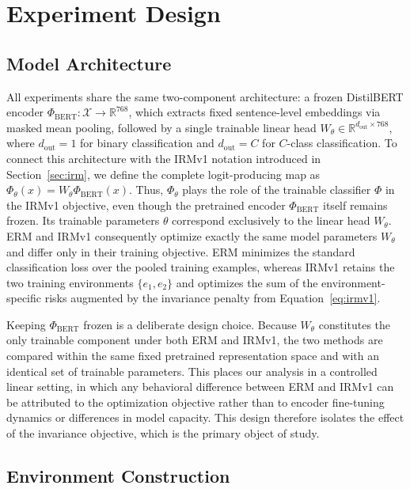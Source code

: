 \documentclass[11pt]{article}
\theoremstyle{definition}
\theoremstyle{plain}
\begin{document}
\section{Experiment Design}
\label{sec:experiment-design}

\subsection{Model Architecture}
\label{sec:model-architecture}

All experiments share the same two-component architecture: a frozen DistilBERT encoder \citep{sanh2019distilbert} $\Phi_{\text{BERT}}: \mathcal{X} \rightarrow \mathbb{R}^{768}$, which extracts fixed sentence-level embeddings via masked mean pooling, followed by a single trainable linear head $W_\theta \in \mathbb{R}^{d_{\text{out}} \times 768}$, where $d_{\text{out}}=1$ for binary classification and $d_{\text{out}}=C$ for $C$-class classification. To connect this architecture with the IRMv1 notation introduced in Section~\ref{sec:irm}, we define the complete logit-producing map as $\Phi_\theta(x) = W_\theta \Phi_{\text{BERT}}(x)$. Thus, $\Phi_\theta$ plays the role of the trainable classifier $\Phi$ in the IRMv1 objective, even though the pretrained encoder $\Phi_{\text{BERT}}$ itself remains frozen. Its trainable parameters $\theta$ correspond exclusively to the linear head $W_\theta$. ERM and IRMv1 consequently optimize exactly the same model parameters $W_\theta$ and differ only in their training objective. ERM minimizes the standard classification loss over the pooled training examples, whereas IRMv1 retains the two training environments $\{e_1,e_2\}$ and optimizes the sum of the environment-specific risks augmented by the invariance penalty from Equation~\ref{eq:irmv1}.

Keeping $\Phi_{\text{BERT}}$ frozen is a deliberate design choice. Because $W_\theta$ constitutes the only trainable component under both ERM and IRMv1, the two methods are compared within the same fixed pretrained representation space and with an identical set of trainable parameters. This places our analysis in a controlled linear setting, in which any behavioral difference between ERM and IRMv1 can be attributed to the optimization objective rather than to encoder fine-tuning dynamics or differences in model capacity. This design therefore isolates the effect of the invariance objective, which is the primary object of study.


\subsection{Environment Construction}
\label{sec:environment-construction}
\end{document}
